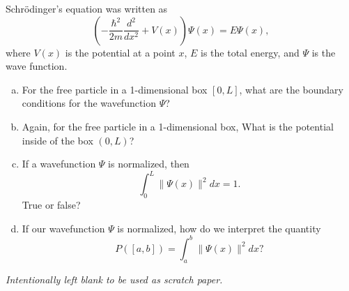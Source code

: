 \documentclass[12pt]{amsbook}
\begin{document}
\newpage
\begin{problem}
Schr\"odinger's equation was written as
\[
\left(-\frac{\hbar^2}{2m}\frac{d^2}{dx^2}+V(x)\right)\Psi(x)=E\Psi(x),
\]
where $V(x)$ is the potential at a point $x$, $E$ is the total energy, and $\Psi$ is the wave function.
\begin{enumerate}[(a)]
    \item For the free particle in a 1-dimensional box $[0,L]$, what are the boundary conditions for the wavefunction $\Psi$?
    \vspace*{3cm}
    \item Again, for the free particle in a 1-dimensional box, What is the potential inside of the box $(0,L)$?
    \vspace*{3cm}
    \item If a wavefunction $\Psi$ is normalized, then
    \[
    \int_0^L \|\Psi(x)\|^2dx=1.
    \]
    True or false?
    \vspace*{3cm}
    \item If our wavefunction $\Psi$ is normalized, how do we interpret the quantity
    \[
    P([a,b])=\int_a^b \|\Psi(x)\|^2dx?
    \]
    \vspace*{3cm}

\end{enumerate}
\end{problem}

\newpage
\emph{Intentionally left blank to be used as scratch paper.}\\
\end{document}
